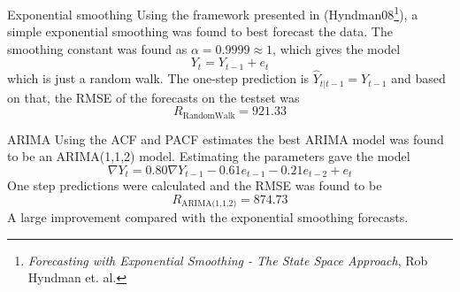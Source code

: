 \begin{frame}{Exponential smoothing}
    Using the framework presented in (Hyndman08\footnote{{\it Forecasting with Exponential Smoothing - The State Space Approach}, Rob Hyndman et. al.}), a simple exponential smoothing was found to best forecast the data. The smoothing constant was found as $\alpha=0.9999\approx 1$, which gives the model
    \begin{equation*}
        Y_t = Y_{t-1} + e_t
    \end{equation*}
    which is just a random walk. The one-step prediction is $\widehat{Y}_{t|t-1}=Y_{t-1}$ and based on that, the RMSE of the forecasts on the testset was
    \begin{equation*}
        R_{\textrm{RandomWalk}} = 921.33
    \end{equation*}
\end{frame}

\begin{frame}{ARIMA}
    Using the ACF and PACF estimates the best ARIMA model was found to be an ARIMA(1,1,2) model. Estimating the parameters gave the model
    \begin{equation*}
        \nabla Y_t = 0.80\nabla Y_{t-1} - 0.61 e_{t-1} - 0.21 e_{t-2} + e_t
    \end{equation*}
    One step predictions were calculated and the RMSE was found to be
    \begin{equation*}
        R_{\textrm{ARIMA(1,1,2)}} = 874.73
    \end{equation*}
    A large improvement compared with the exponential smoothing forecasts.
\end{frame}


